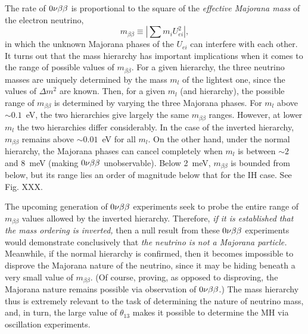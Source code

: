 \documentclass[../thesis.tex]{subfiles}
\begin{document}
The rate of $0\nu\beta\beta$ is proportional to the square of the \emph{effective Majorana mass} of the electron neutrino,
\begin{equation*}
  m_{\beta\beta} \equiv \left| \sum m_i U^2_{ei} \right|,
\end{equation*}
in which the unknown Majorana phases of the $U_{ei}$ can interfere with each other. It turns out that the mass hierarchy has important implications when it comes to the range of possible values of $m_{\beta\beta}$. For a given hierarchy, the three neutrino masses are uniquely determined by the mass $m_l$ of the lightest one, since the values of $\Delta m^2$ are known. Then, for a given $m_l$ (and hierarchy), the possible range of $m_{\beta\beta}$ is determined by varying the three Majorana phases. For $m_l$ above $\sim0.1$~eV, the two hierarchies give largely the same $m_{\beta\beta}$ ranges. However, at lower $m_l$ the two hierarchies differ considerably. In the case of the inverted hierarchy, $m_{\beta\beta}$ remains above $\sim0.01$~eV for all $m_l$. On the other hand, under the normal hierarchy, the Majorana phases can cancel completely when $m_l$ is between $\sim2$ and 8~meV (making $0\nu\beta\beta$ unobservable). Below 2~meV, $m_{\beta\beta}$ is bounded from below, but its range lies an order of magnitude below that for the IH case. See Fig. XXX.

The upcoming generation of $0\nu\beta\beta$ experiments seek to probe the entire range of $m_{\beta\beta}$ values allowed by the inverted hierarchy. Therefore, \emph{if it is established that the mass ordering is inverted,} then a null result from these $0\nu\beta\beta$ experiments would demonstrate conclusively that \emph{the neutrino is not a Majorana particle.} Meanwhile, if the normal hierarchy is confirmed, then it becomes impossible to disprove the Majorana nature of the neutrino, since it may be hiding beneath a very small value of $m_{\beta\beta}$. (Of course, proving, as opposed to disproving, the Majorana nature remains possible via observation of $0\nu\beta\beta$.) The mass hierarchy thus is extremely relevant to the task of determining the nature of neutrino mass, and, in turn, the large value of $\theta_{13}$ makes it possible to determine the MH via oscillation experiments.
\end{document}
